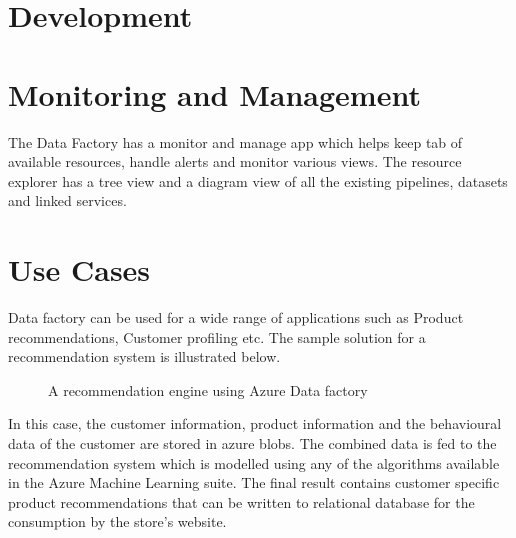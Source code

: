 \documentclass[9pt,twocolumn,twoside]{styles/osajnl}
\begin{document}
\section{Development}

\section{Monitoring and Management}
The Data Factory has a monitor and manage app which helps keep tab of available resources, handle alerts and monitor various views. The resource explorer has a tree view and a diagram view of all the existing pipelines, datasets and linked services. ~\cite{www-microsoft-azure-moniter}

\section{Use Cases}
Data factory can be used for a wide range of applications such as Product recommendations, Customer profiling etc. The sample solution for a recommendation system is illustrated below.
\begin{figure}[htbp]
\centering
{}
\caption{A recommendation engine using Azure Data factory}
\label{fig:copy-local}
\end{figure}
In this case, the customer information, product information and the behavioural data of the customer are stored in azure blobs. The combined data is fed to the recommendation system which is modelled using any of the algorithms available in the Azure Machine Learning suite. The final result contains customer specific product recommendations that can be written to relational database for the consumption by the store's website.
\end{document}

